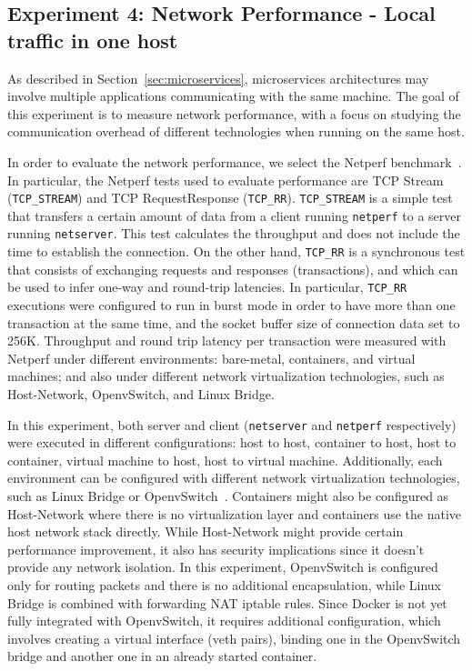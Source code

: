 \documentclass[conference]{IEEEtran}
\begin{document}
\subsection{Experiment 4: Network Performance - Local traffic in one host}
\label{sub:exp4}

As described in Section~\ref{sec:microservices}, microservices architectures
may involve multiple applications communicating with the same machine. The goal
of this experiment is to measure network performance, with a focus on studying
the communication overhead of different technologies when running on the same
host.

In order to evaluate the network performance, we select the Netperf
benchmark~\cite{netperf}. In particular, the Netperf tests used to evaluate
performance are TCP Stream (\texttt{TCP\_STREAM}) and TCP RequestResponse
(\texttt{TCP\_RR}). \texttt{TCP\_STREAM} is a simple test that transfers a
certain amount of data from a client running \texttt{netperf} to a server
running \texttt{netserver}. This test calculates the throughput and does not
include the time to establish the connection. On the other hand,
\texttt{TCP\_RR} is a synchronous test that consists of exchanging requests
and responses (transactions), and which can be used to infer one-way and
round-trip latencies.  In particular, \texttt{TCP\_RR} executions were
configured to run in burst mode in order to have more than one transaction at
the same time, and the socket buffer size of connection data set to 256K.
Throughput and round trip latency per transaction were measured with Netperf
under different environments: bare-metal, containers, and virtual machines;
and also under different network virtualization technologies, such as
Host-Network, OpenvSwitch, and Linux Bridge.

In this experiment, both server and client (\texttt{netserver} and
\texttt{netperf} respectively) were executed in different configurations: host
to host, container to host, host to container, virtual machine to host, host
to virtual machine.  Additionally, each environment can be configured with
different network virtualization technologies, such as Linux Bridge or
OpenvSwitch~\cite{OVS}. Containers might also be configured as Host-Network
where there is no virtualization layer and containers use the native host
network stack directly. While Host-Network might provide certain performance
improvement, it also has security implications since it doesn't provide any
network isolation. In this experiment, OpenvSwitch is configured only for
routing packets and there is no additional encapsulation, while Linux Bridge
is combined with forwarding NAT iptable rules. Since Docker is not yet fully
integrated with OpenvSwitch, it requires additional configuration, which
involves creating a virtual interface (veth pairs), binding one in the 
OpenvSwitch bridge and another one in an already started container.
\end{document}
